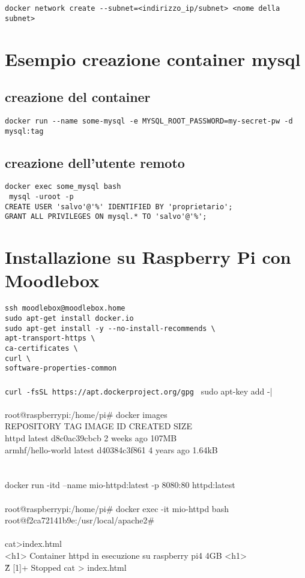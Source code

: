 \documentclass[10pt,a4paper]{report}
\newcommand{\nota}[2]{%
	\marginpar[{\raggedleft\tiny\sffamily #1\\}]{%
		{\raggedright\tiny\sffamily #1\\}}}
\begin{document}
	\verb|docker network create --subnet=<indirizzo_ip/subnet> <nome della subnet>|
	\section{Esempio creazione container mysql}
	\subsection{creazione del container}
	\verb|docker run --name some-mysql -e MYSQL_ROOT_PASSWORD=my-secret-pw -d mysql:tag|\\
	\subsection{creazione dell'utente remoto}
	\verb|docker exec some_mysql bash|\\
	\verb| mysql -uroot -p|\\
	\verb|CREATE USER 'salvo'@'%' IDENTIFIED BY 'proprietario';|\\
	\verb|GRANT ALL PRIVILEGES ON mysql.* TO 'salvo'@'%';|\\
	
\section{Installazione su Raspberry Pi con Moodlebox}
\verb|ssh moodlebox@moodlebox.home|	\\
\verb|sudo apt-get install docker.io|\\
\verb|sudo apt-get install -y --no-install-recommends \|\\
\verb|apt-transport-https \|\\
\verb|ca-certificates \|\\
\verb|curl \|\\
\verb|software-properties-common|\\\\
\verb|curl -fsSL https://apt.dockerproject.org/gpg | sudo apt-key add -|
\\\\
root@raspberrypi:/home/pi\# docker images\\
	REPOSITORY          TAG       IMAGE ID       CREATED       SIZE\\
	httpd               latest    d8c0ac39cbcb   2 weeks ago   107MB\\
	armhf/hello-world   latest    d40384c3f861   4 years ago   1.64kB\\
	\\\\
	 docker run -itd --name mio-httpd:latest -p 8080:80 httpd:latest
	\\\\
	root@raspberrypi:/home/pi\# docker exec -it mio-httpd  bash\\
	root@f2ca72141b9e:/usr/local/apache2\#
	\\
	\\
	cat>index.html\\
	<h1> Container httpd in esecuzione su raspberry pi4 4GB <\/h1>\\
	\^Z
	[1]+  Stopped                 cat > index.html\\
	 
	
\end{document}
